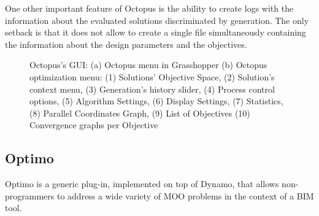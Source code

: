 One other important feature of Octopus is the ability to create logs with the information about the evaluated solutions discriminated by generation. The only setback is that it does not allow to create a single file simultaneously containing the information about the design parameters and the objectives. 

\begin{figure}[htbp]
	\centering
	\hfill
	\caption[Octopus GUI]{Octopus's \ac{GUI}: (a) Octopus menu in Grasshopper (b) Octopus optimization menu: (1) Solutions' Objective Space, (2) Solution's context menu, (3) Generation's history slider, (4) Process control options, (5) Algorithm Settings, (6) Display Settings, (7) Statistics, (8) Parallel Coordinates Graph, (9) List of Objectives (10) Convergence graphs per Objective}
	\label{fig:octopus}
	
\end{figure}


\subsection{Optimo}
\label{subsec:Optimo}

Optimo \cite{OPTIMO} is a generic plug-in, implemented on top of Dynamo, that allows non-programmers to address a wide variety of \ac{MOO} problems in the context of a \ac{BIM} tool. 

